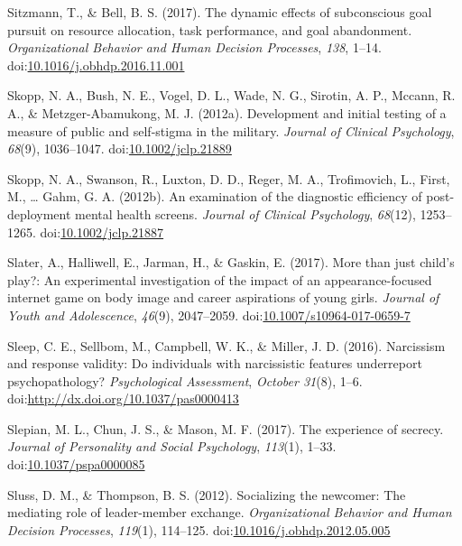 \documentclass[english,man]{apa6}
\theoremstyle{definition}
\theoremstyle{definition}
\theoremstyle{definition}
\theoremstyle{remark}
\begin{document}
\hypertarget{ref-Sitzmann2017}{}
Sitzmann, T., \& Bell, B. S. (2017). The dynamic effects of subconscious
goal pursuit on resource allocation, task performance, and goal
abandonment. \emph{Organizational Behavior and Human Decision
Processes}, \emph{138}, 1--14.
doi:\href{https://doi.org/10.1016/j.obhdp.2016.11.001}{10.1016/j.obhdp.2016.11.001}

\hypertarget{ref-Skopp2012a}{}
Skopp, N. A., Bush, N. E., Vogel, D. L., Wade, N. G., Sirotin, A. P.,
Mccann, R. A., \& Metzger-Abamukong, M. J. (2012a). Development and
initial testing of a measure of public and self-stigma in the military.
\emph{Journal of Clinical Psychology}, \emph{68}(9), 1036--1047.
doi:\href{https://doi.org/10.1002/jclp.21889}{10.1002/jclp.21889}

\hypertarget{ref-Skopp2012}{}
Skopp, N. A., Swanson, R., Luxton, D. D., Reger, M. A., Trofimovich, L.,
First, M., \ldots{} Gahm, G. A. (2012b). An examination of the
diagnostic efficiency of post-deployment mental health screens.
\emph{Journal of Clinical Psychology}, \emph{68}(12), 1253--1265.
doi:\href{https://doi.org/10.1002/jclp.21887}{10.1002/jclp.21887}

\hypertarget{ref-Slater2017}{}
Slater, A., Halliwell, E., Jarman, H., \& Gaskin, E. (2017). More than
just child's play?: An experimental investigation of the impact of an
appearance-focused internet game on body image and career aspirations of
young girls. \emph{Journal of Youth and Adolescence}, \emph{46}(9),
2047--2059.
doi:\href{https://doi.org/10.1007/s10964-017-0659-7}{10.1007/s10964-017-0659-7}

\hypertarget{ref-Sleep2016}{}
Sleep, C. E., Sellbom, M., Campbell, W. K., \& Miller, J. D. (2016).
Narcissism and response validity: Do individuals with narcissistic
features underreport psychopathology? \emph{Psychological Assessment},
\emph{October 31}(8), 1--6.
doi:\href{https://doi.org/http://dx.doi.org/10.1037/pas0000413}{http://dx.doi.org/10.1037/pas0000413}

\hypertarget{ref-Slepian2017}{}
Slepian, M. L., Chun, J. S., \& Mason, M. F. (2017). The experience of
secrecy. \emph{Journal of Personality and Social Psychology},
\emph{113}(1), 1--33.
doi:\href{https://doi.org/10.1037/pspa0000085}{10.1037/pspa0000085}

\hypertarget{ref-Sluss2012}{}
Sluss, D. M., \& Thompson, B. S. (2012). Socializing the newcomer: The
mediating role of leader-member exchange. \emph{Organizational Behavior
and Human Decision Processes}, \emph{119}(1), 114--125.
doi:\href{https://doi.org/10.1016/j.obhdp.2012.05.005}{10.1016/j.obhdp.2012.05.005}
\end{document}
